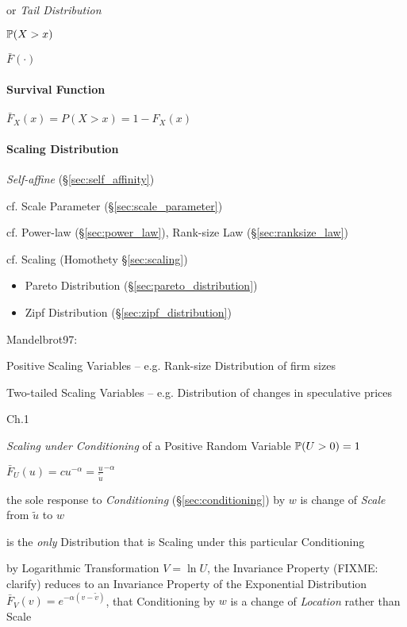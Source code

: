 or \emph{Tail Distribution}

$\mathbb{P}(X > x)$

$\bar{F}(\cdot)$



\paragraph{Survival Function}\label{sec:survival_function}\hfill

$\bar{F}_X(x) = P(X > x) = 1 - F_X(x)$



\paragraph{Scaling Distribution}\label{sec:scaling_distribution}\hfill

\emph{Self-affine} (\S\ref{sec:self_affinity})

cf. Scale Parameter (\S\ref{sec:scale_parameter})

cf. Power-law (\S\ref{sec:power_law}), Rank-size Law (\S\ref{sec:ranksize_law})

cf. Scaling (Homothety \S\ref{sec:scaling})


\begin{itemize}
  \item Pareto Distribution (\S\ref{sec:pareto_distribution})
  \item Zipf Distribution (\S\ref{sec:zipf_distribution})
\end{itemize}

Mandelbrot97:

Positive Scaling Variables -- e.g. Rank-size Distribution of firm sizes

Two-tailed Scaling Variables -- e.g. Distribution of changes in speculative
prices

Ch.1

\emph{Scaling under Conditioning} of a Positive Random Variable
$\mathbb{P}(U > 0) = 1$

$\bar{F}_U(u) = c u^{-\alpha} = \frac{u}{\tilde{u}}^{-\alpha}$

the sole response to \emph{Conditioning} (\S\ref{sec:conditioning}) by $w$ is
change of \emph{Scale} from $\tilde{u}$ to $w$

is the \emph{only} Distribution that is Scaling under this particular
Conditioning

by Logarithmic Transformation $V = \ln U$, the Invariance Property (FIXME:
clarify) reduces to an Invariance Property of the Exponential Distribution
$\bar{F}_V(v) = e^{-\alpha(v - \tilde{v})}$, that Conditioning by $w$ is a
change of \emph{Location} rather than Scale

